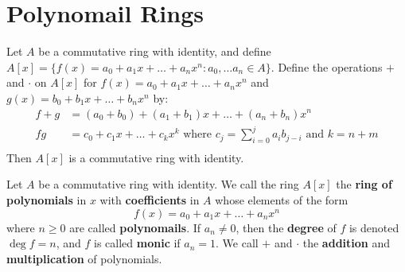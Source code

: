 \section{Polynomail Rings}
\label{section1}

\begin{theorem}\label{1.2.1}
    Let $A$ be a commutative ring with identity, and define $A[x]=
    \{f(x)=a_0+a_1x+\dots+a_nx^n : a_0, \dots a_n \in A\}$. Define the
    operations $+$ and  $\cdot$ on $A[x]$ for $f(x)=a_0+a_1x+\dots+a_nx^n$ and
    $g(x)=b_0+b_1x+\dots+b_nx^n$ by:
    \begin{align*}
        f+g &=  (a_0+b_0)+(a_1+b_1)x+\dots+(a_n+b_n)x^n \\
        fg  &=  c_0+c_1x+\dots+c_kx^k \text{ where }
        c_j=\sum_{i=0}^j{a_ib_{j-i}} \text{ and } k=n+m  \\
    \end{align*}
    Then $A[x]$ is a commutative ring with identity.
\end{theorem}

\begin{definition}
    Let $A$ be a commutative ring with identity. We call the ring $A[x]$ the
    \textbf{ring of polynomials} in $x$ with \textbf{coefficients} in $A$ whose
    elements of the form
    \begin{equation*}
        f(x)=a_0+a_1x+\dots+a_nx^n
    \end{equation*}
    where $n \geq 0$ are called \textbf{polynomails}. If $a_n \neq 0$, then the
     \textbf{degree} of $f$ is  denoted $\deg{f}=n$, and $f$ is called
     \textbf{monic} if $a_n=1$. We call $+$ and $\cdot$ the  \textbf{addition}
     and \textbf{multiplication} of polynomials.
\end{definition}

